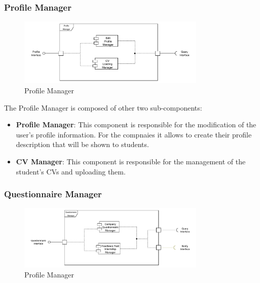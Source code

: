 \subsubsection{Profile Manager}
\label{subsub:profile-manager}

\begin{figure}[H]
      \centering
      \includegraphics[width=0.8\textwidth]{Images/Profile_Architecture.pdf}
      \caption{Profile Manager}
      \label{profile-manager-arch}
\end{figure}

\par The Profile Manager is composed of other two sub-components:
\begin{itemize}
      \item \textbf{Profile Manager}: This component is responsible for the modification of the user's profile information.
            For the compnaies it allows to create their profile description that will be shown to students.
      \item \textbf{CV Manager}: This component is responsible for the management of the student's CVs and uploading them.
\end{itemize}

\subsubsection{Questionnaire Manager}
\label{subsub:questionnaire-manager}

\begin{figure}[H]
      \centering
      \includegraphics[width=0.8\textwidth]{Images/Questionnaire_Architecture.pdf}
      \caption{Profile Manager}
      \label{questionnaire-manager-arch}
\end{figure}

